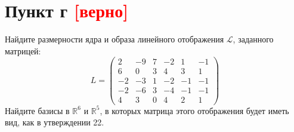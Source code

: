 \documentclass[12pt]{article}
\begin{document}
    \section*{Пункт г \textcolor{red}{[верно]}}
    Найдите размерности ядра и образа линейного отображения $\mathcal{L}$, заданного матрицей:
    \[
        L
        =
        \begin{pmatrix}
            2  & -9 & 7 & -2 & 1  & -1 \\
            6  & 0  & 3 & 4  & 3  & 1  \\
            -2 & -3 & 1 & -2 & -1 & -1 \\
            -2 & -6 & 3 & -4 & -1 & -1 \\
            4  & 3  & 0 & 4  & 2  & 1
        \end{pmatrix}
    \]
    Найдите базисы в $\mathbb{R}^6$ и $\mathbb{R}^5$, в которых матрица этого отображения будет иметь вид, как в утверждении 22.
\end{document}
